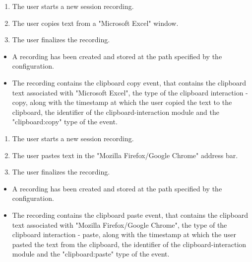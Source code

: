 \begin{tests}
	{\begin{enumerate}
		\item The \gls{user} starts a new \gls{session} recording.
		\item The \gls{user} copies text from a "Microsoft Excel" window.
		\item The \gls{user} finalizes the recording.
	\end{enumerate}}
	{\begin{itemize}
		\item A recording has been created and stored at the path specified by the configuration.
		\item The recording contains the clipboard copy \gls{event},  that contains the clipboard text associated with "Microsoft Excel", the type of the clipboard interaction - copy, along with the timestamp at which the \gls{user} copied the text to the clipboard, the identifier of the clipboard-interaction module and the "clipboard:copy" type of the event.
	\end{itemize}}
	
	{\begin{enumerate}
		\item The \gls{user} starts a new \gls{session} recording.
		\item The \gls{user} pastes text in the "Mozilla Firefox/Google Chrome" address bar.
		\item The \gls{user} finalizes the recording.
	\end{enumerate}}
	{\begin{itemize}
		\item A recording has been created and stored at the path specified by the configuration.
		\item The recording contains the clipboard paste \gls{event},  that contains the clipboard text associated with "Mozilla Firefox/Google Chrome", the type of the clipboard interaction - paste, along with the timestamp at which the \gls{user} pasted the text from the clipboard, the identifier of the clipboard-interaction module and the "clipboard:paste" type of the event.
	\end{itemize}}
\end{tests}

